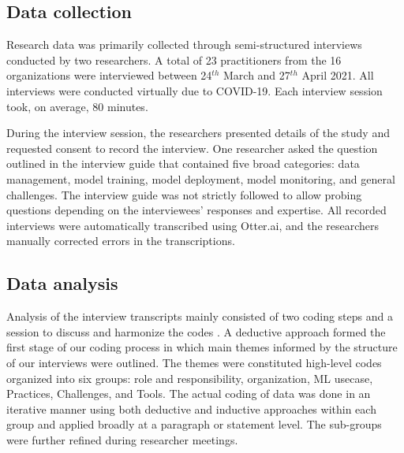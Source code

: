 \subsection{Data collection}
Research data was primarily collected through semi-structured interviews conducted by two researchers. A total of 23 practitioners from the 16 organizations were interviewed between 24$^{th}$ March and 27$^{th}$ April 2021. All interviews were conducted virtually due to COVID-19. Each interview session took, on average, 80 minutes. 

During the interview session, the researchers presented details of the study and requested consent to record the interview. One researcher asked the question outlined in the interview guide that contained five broad categories: data management, model training, model deployment, model monitoring, and general challenges. The interview guide was not strictly followed to allow probing questions depending on the interviewees' responses and expertise. All recorded interviews were automatically transcribed using Otter.ai, and the researchers manually corrected errors in the transcriptions.  



\subsection{Data analysis}
Analysis of the interview transcripts mainly consisted of two coding steps and a session to discuss and harmonize the codes \cite{Runeson2008}. A deductive approach formed the first stage of our coding process in which main themes informed by the structure of our interviews were outlined. The themes were constituted high-level codes organized into six groups: role and responsibility, organization, ML usecase, Practices, Challenges, and Tools. The actual coding of data was done in an iterative manner using both deductive and inductive \cite{Runeson2008} approaches within each group and applied broadly at a paragraph or statement level. The sub-groups were further refined during researcher meetings.

